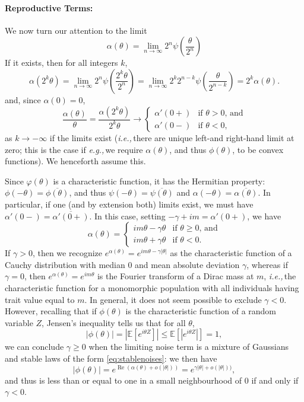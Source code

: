 \documentclass{article}
\newcommand{\E}{\mathbb{E}}
\newcommand{\ie}{\textit{i.e.,}\,}
\newcommand{\eg}{\textit{e.g.,}\,}
\newcommand{\1}{\mathbbm{1}}
\DeclareMathOperator*{\re}{Re}
\theoremstyle{remark}
\theoremstyle{definition}
\begin{document}
\paragraph{Reproductive Terms:}
We now turn our attention to the limit
\[
		\alpha(\theta) = \lim_{n \to \infty} 2^{n}\psi\left(\frac{\theta}{2^{n}}\right)
\]
If it exists, then for all integers $k$, 
\[
	\alpha(2^{k} \theta) = \lim_{n \to \infty} 2^{n}\psi\left(\frac{2^{k} \theta}{2^{n}}\right) =  \lim_{n \to \infty} 2^{k} 2^{n-k} \psi\left(\frac{\theta}{2^{n-k}}\right) = 2^{k} \alpha(\theta).
\]
and, since $\alpha(0) = 0$,
\[
	\frac{\alpha(\theta)}{\theta} = \frac{\alpha(2^{k} \theta)}{2^{k}\theta} 
	\to \begin{cases} 
		\alpha'(0+) & \text{if $\theta > 0$, and}\\
		\alpha'(0-) & \text{if $\theta < 0$,}
	\end{cases}
\]
as $k \to - \infty$ if the limits exist (\ie there are unique left-and right-hand limit at zero; this is the case if \eg we require $\alpha(\theta)$, and thus $\phi(\theta)$, to be convex functions).  We henceforth assume this.

Since $\varphi(\theta)$ is a characteristic function, it has the Hermitian property: $\phi(-\theta) = \overline{\phi(\theta)}$, and thus $\psi(-\theta) = \overline{\psi(\theta)}$ and $\alpha(-\theta) = \overline{\alpha(\theta)}$.  In particular, if one (and by extension both) limits exist, we must have $\alpha'(0-) = \overline{\alpha'(0+)}$.  In this case, setting $-\gamma + i m = \alpha'(0+)$, we have
\[
	\alpha(\theta) = \begin{cases} 
		i m\theta - \gamma \theta & \text{if $\theta \geq 0$, and}\\
		i m\theta + \gamma \theta & \text{if $\theta < 0$}.
	\end{cases}
\]
If $\gamma > 0$, then we recognize $e^{\alpha(\theta)} = e^{im \theta -\gamma|\theta|}$ as the characteristic function of a Cauchy distribution with median 0 and mean absolute deviation $\gamma$, whereas if $\gamma = 0$, then $e^{\alpha(\theta)} = e^{im \theta}$ is the Fourier transform of a Dirac mass at $m$, \ie the characteristic function for a monomorphic population with all individuals having trait value equal to $m$.    In general, it does not seem possible to exclude $\gamma < 0$. However, recalling that if $\phi(\theta)$ is the characteristic function of a random variable $Z$, Jensen's inequality tells us that for all $\theta$,
\begin{equation}\label{eq:CF-J}
	|\phi(\theta)| = \left|\E\left[e^{i\theta Z}\right]\right| \leq \E\left[\left|e^{i\theta Z}\right|\right] = 1,
\end{equation}
we can conclude $\gamma \geq 0$ when the limiting noise term is a mixture of Gaussians and stable laws of the form \eqref{eq:stablenoises}: we then have 
\[
	|\phi(\theta)| = e^{\re(\alpha(\theta) + o(|\theta|))} = e^{\gamma |\theta| + o(|\theta|))},
\] 
and thus is less than or equal to one in a small neighbourhood of $0$ if and only if $\gamma < 0$.
\end{document}
